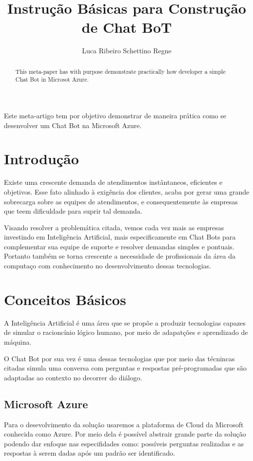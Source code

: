 \documentclass[12pt]{article}
\title{Instrução Básicas para Construção de Chat BoT}
\author{Luca Ribeiro Schettino Regne\inst{1}}
\begin{document}
 

\maketitle

\begin{abstract}
  This meta-paper has with purpose demonstrate practically how developer a simple Chat Bot in Microsot Azure.  
\end{abstract}
     
\begin{resumo} 
  Este meta-artigo tem por objetivo demonstrar de maneira prática como se desenvolver um Chat Bot na Microsoft Azure.
\end{resumo}


\section{Introdução}

Existe uma crescente demanda de atendimentos instântaneos, eficientes e objetivos. Esse fato alinhado à exigência dos clientes, acaba por gerar uma grande sobrecarga sobre as equipes de atendimentos, e consequentemente às empresas que teem dificuldade para suprir tal demanda.

Visando resolver a problemática citada, vemos cada vez mais as empresas investindo em Inteligência Artificial,  mais especificamente em  Chat Bots para complementar sua equipe de suporte e resolver demandas simples e pontuais. Portanto também se torna crescente a necessidade de profissionais da área da computaço com conhecimento no desenvolvimento dessas tecnologias. 
\section{Conceitos Básicos}
A Inteligência Artificial é uma área que se propôe a produzir tecnologias capazes de simular o racioncínio lógico humano, por meio de adapatções e aprendizado de máquina.

O Chat Bot por sua vez é uma dessas tecnologias que por meio das técnincas citadas simula uma conversa com perguntas e respostas pré-programadas que são adaptadas ao contexto no decorrer do diálogo.

\subsection{Microsoft Azure}
Para o desevolvimento da solução usaremos a plataforma de Cloud da Microsoft conhecida como Azure. Por meio dela é possível abstrair grande parte da solução podendo dar enfoque nas especifidades como: possíveis perguntas realizadas e as respostas à serem dadas após um padrão ser identificado.
\end{document}
